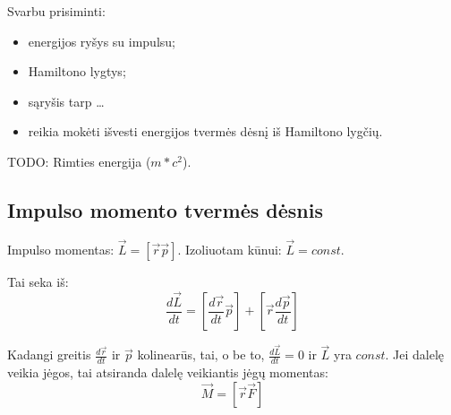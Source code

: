 Svarbu prisiminti:
\begin{itemize}
  \item energijos ryšys su impulsu;
  \item Hamiltono lygtys;
  \item sąryšis tarp …
  \item reikia mokėti išvesti energijos tvermės dėsnį iš Hamiltono
    lygčių.
\end{itemize}

TODO: Rimties energija ($m*c^{2}$).

\subsection{Impulso momento tvermės dėsnis}

Impulso momentas: $\vec{L} = \left[ \vec{r}\vec{p} \right]$.
Izoliuotam kūnui: $\vec{L} = const.$

Tai seka iš:
\begin{equation*}
  \frac{d\vec{L}}{dt} = \left[ \frac{d\vec{r}}{dt} \vec{p} \right] +
  \left[ \vec{r} \frac{d\vec{p}}{dt} \right]
\end{equation*}

Kadangi greitis $\frac{d\vec{r}}{dt}$ ir $\vec{p}$ kolinearūs, tai,
o be to, $\frac{d\vec{L}}{dt} = 0$ ir $\vec{L}$ yra $const$.
Jei dalelę veikia jėgos, tai atsiranda dalelę veikiantis jėgų
momentas:
\begin{equation*}
  \vec{M} = \left[ \vec{r}\vec{F} \right]
\end{equation*}
